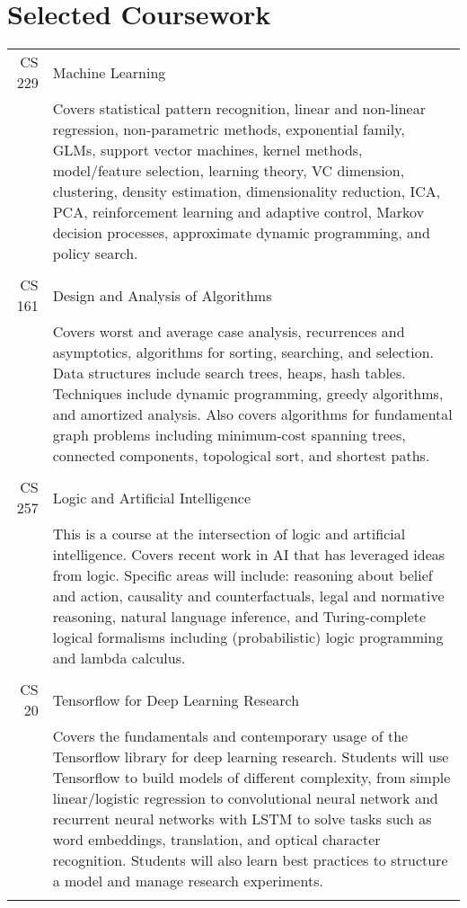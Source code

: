 \documentclass[letterpaper,10pt]{article}
\begin{document}
\section{Selected Coursework}
\begin{tabular}{r|p{13.3cm}}
 \textsc{CS 229} & Machine Learning \\&\footnotesize{Covers statistical pattern recognition, linear and non-linear regression, non-parametric methods, exponential family, GLMs, support vector machines, kernel methods, model/feature selection, learning theory, VC dimension, clustering, density estimation, dimensionality reduction, ICA, PCA, reinforcement learning and adaptive control, Markov decision processes, approximate dynamic programming, and policy search.}\\\multicolumn{2}{c}{} \\
 \textsc{CS 161} & Design and Analysis of Algorithms \\&\footnotesize{Covers worst and average case analysis, recurrences and asymptotics, algorithms for sorting, searching, and selection. Data structures include  search trees, heaps, hash tables. Techniques include dynamic programming, greedy algorithms, and amortized analysis. Also covers algorithms for fundamental graph problems including minimum-cost spanning trees, connected components, topological sort, and shortest paths.}\\\multicolumn{2}{c}{} \\
  \textsc{CS 257} & Logic and Artificial Intelligence \\&\footnotesize{This is a course at the intersection of logic and artificial intelligence. Covers recent work in AI that has leveraged ideas from logic. Specific areas will include: reasoning about belief and action, causality and counterfactuals, legal and normative reasoning, natural language inference, and Turing-complete logical formalisms including (probabilistic) logic programming and lambda calculus.}\\\multicolumn{2}{c}{} \\
    \textsc{CS 20} & Tensorflow for Deep Learning Research \\&\footnotesize{Covers the fundamentals and contemporary usage of the Tensorflow library for deep learning research. Students will use Tensorflow to build models of different complexity, from simple linear/logistic regression to convolutional neural network and recurrent neural networks with LSTM to solve tasks such as word embeddings, translation, and optical character recognition. Students will also learn best practices to structure a model and manage research experiments.}\\\multicolumn{2}{c}{} \\

\end{tabular}
\end{document}
